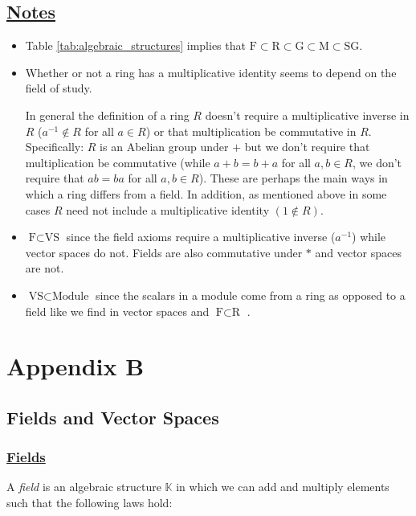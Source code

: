 \documentclass{article}
\theoremstyle{definition}
\begin{document}
\subsection*{\underline{Notes}}
\begin{itemize}
\item Table \ref{tab:algebraic_structures} implies that $\text{F}
\subset \text{R} \subset \text{G} \subset \text{M} \subset \text{SG}$.
\item Whether or not a ring has a multiplicative identity 
      seems to depend on the field of study. 

\smallskip
\noindent
      In general the definition of a ring $R$ doesn't require a
      multiplicative inverse in $R$ ($a^{-1} \notin R$ for all $a
      \in R$) or that multiplication be commutative in
      $R$. Specifically: $R$ is an Abelian group under $+$ but we
      don't require that multiplication be commutative (while
      $a+b = b+a$ for all $a,b \in R$, we don't require that $ab
      = ba$ for all $a,b \in R$). These are perhaps the main ways
      in which a ring differs from a field. In addition, as
      mentioned above in some cases $R$ need not include a
      multiplicative identity $(1 \notin R)$.

\item $\text{F} \subset \text{VS}$ since the field axioms require
      a multiplicative inverse ($a^{-1}$) while vector spaces do
      not. Fields are also commutative under $*$ and vector
      spaces are not.

\item $\text{VS} \subset \text{Module}$ since the scalars in a
      module come from a ring as opposed to a field like we find
      in vector spaces and $\text{F} \subset \text{R}$
\cite{module_theory_blyth}.
\end{itemize}

\section*{Appendix B}
\subsection*{{\Large Fields and Vector Spaces}}

\smallskip
\subsubsection*{\large \underline {Fields}}
A \emph{field} is an algebraic structure $\mathbb{K}$ in which we can 
add and multiply elements such that the following laws hold:
\end{document}
